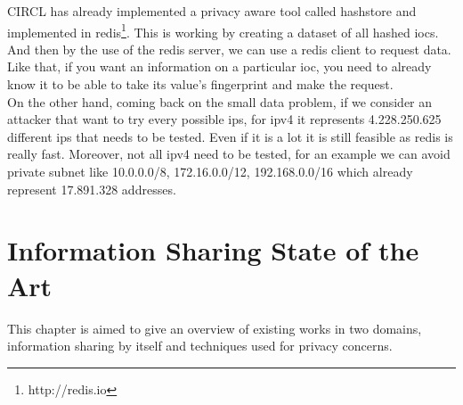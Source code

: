 \documentclass{eplmastersthesis}
\begin{document}
CIRCL has already implemented a privacy aware tool called hashstore and implemented in redis\footnote{http://redis.io}. This is working by creating a dataset of all hashed \gls{ioc}s. And then by the use of the redis server, we can use a redis client to request data.\\
Like that, if you want an information on a particular \gls{ioc}, you need to already know it to be able to take its value's fingerprint and make the request.\\
On the other hand, coming back on the small data problem, if we consider an attacker that want to try every possible \gls{ip}s, for \gls{ipv4} it represents 4.228.250.625 different \gls{ip}s that needs to be tested. Even if it is a lot it is still feasible as redis is really fast. Moreover, not all \gls{ipv4} need to be tested, for an example we can avoid private subnet like 10.0.0.0/8, 172.16.0.0/12, 192.168.0.0/16 which already represent 17.891.328 addresses.


\chapter{Information Sharing State of the Art}

This chapter is aimed to give an overview of existing works in two domains, information sharing by itself and techniques used for privacy concerns.\\
\end{document}
